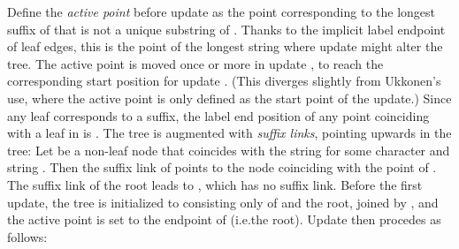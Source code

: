 \documentclass{llncs}
\begin{document}
 Define the
\emph{active point} before update  as the point corresponding to the
longest suffix of  that is not a unique substring of
. Thanks to the implicit label endpoint of leaf edges, this is the point
of the longest string where update  might alter the tree. The active
point is moved once or more in update , to reach the corresponding start
position for update . (This diverges
slightly from Ukkonen's use, where the active point is only defined as the
start point of the update.)  Since any leaf corresponds to a
suffix, the label end position of any point coinciding with a leaf in 
is . The tree is augmented with \emph{suffix links},
pointing upwards in the tree: Let  be a non-leaf node that coincides with
the string  for some character  and string . Then the suffix link of
 points to the node coinciding with the point of . The suffix link of the
root leads to , which has no suffix link. Before the first update,
the tree is initialized to  consisting only of  and the
root, joined by , and the active point is set to the endpoint of
 (i.e.\@ the root). Update  then procedes as
follows:
\end{document}
